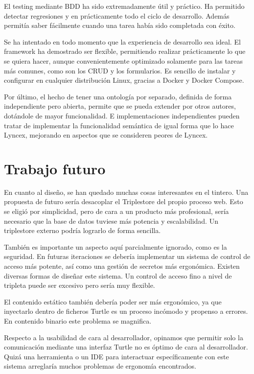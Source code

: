 \documentclass[openright,twoside,12pt]{book}
\begin{document}
El testing mediante BDD ha sido extremadamente útil y práctico. Ha permitido detectar regresiones y en prácticamente todo el ciclo de desarrollo. Además permitía saber fácilmente cuando una tarea había sido completada con éxito.

Se ha intentado en todo momento que la experiencia de desarrollo sea ideal.
El framework ha demostrado ser flexible, permitiendo realizar prácticamente lo que se quiera hacer, aunque convenientemente optimizado solamente para las tareas más comunes, como son los CRUD y los formularios. Es sencillo de instalar y configurar en cualquier distribución Linux, gracias a Docker y Docker Compose.

Por último, el hecho de tener una ontología por separado, definida de forma independiente pero abierta, permite que se pueda extender por otros autores, dotándole de mayor funcionalidad. E implementaciones independientes pueden tratar de implementar la funcionalidad semántica de igual forma que lo hace Lyncex, mejorando en aspectos que se consideren peores de Lyncex.

\section{Trabajo futuro}

En cuanto al diseño, se han quedado muchas cosas interesantes en el tintero. Una propuesta de futuro sería desacoplar el Triplestore del propio proceso web. Esto se eligió por simplicidad, pero de cara a un producto más profesional, sería necesario que la base de datos tuviese más potencia y escalabilidad. Un triplestore externo podría lograrlo de forma sencilla.

También es importante un aspecto aquí parcialmente ignorado, como es la seguridad. En futuras iteraciones se debería implementar un sistema de control de acceso más potente, así como una gestión de secretos más ergonómica. Existen diversas formas de diseñar este sistema. Un control de acceso fino a nivel de tripleta puede ser excesivo pero sería muy flexible.

El contenido estático también debería poder ser más ergonómico, ya que inyectarlo dentro de ficheros Turtle es un proceso incómodo y propenso a errores. En contenido binario este problema se magnifica.

Respecto a la usabilidad de cara al desarrollador, opinamos que permitir solo la comunicación mediante una interfaz Turtle no es óptimo de cara al desarrollador. Quizá una herramienta o un IDE para interactuar específicamente con este sistema arreglaría muchos problemas de ergonomía encontrados.
\end{document}
